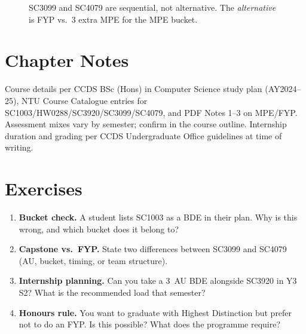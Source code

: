 \begin{figure}[h]
\centering
{}
\caption{SC3099 and SC4079 are sequential, not alternative. The \emph{alternative} is FYP vs.\ 3 extra MPE for the MPE bucket.}
\label{fig:capstone-fyp-flow}
\end{figure}

\section{Chapter Notes}
Course details per CCDS BSc (Hons) in Computer Science study plan (AY2024--25), NTU Course Catalogue entries for SC1003/HW0288/SC3920/SC3099/SC4079, and PDF Notes 1--3 on MPE/FYP. Assessment mixes vary by semester; confirm in the course outline. Internship duration and grading per CCDS Undergraduate Office guidelines at time of writing.

\section{Exercises}
\label{sec:ch04-exercises}
\begin{enumerate}[label=E4.\arabic*, leftmargin=*, itemsep=0.8em]
    \item \textbf{Bucket check.} A student lists SC1003 as a BDE in their plan. Why is this wrong, and which bucket does it belong to?
    \item \textbf{Capstone vs.\ FYP.} State two differences between SC3099 and SC4079 (AU, bucket, timing, or team structure).
    \item \textbf{Internship planning.} Can you take a 3~AU BDE alongside SC3920 in Y3 S2? What is the recommended load that semester?
    \item \textbf{Honours rule.} You want to graduate with Highest Distinction but prefer not to do an FYP. Is this possible? What does the programme require?
\end{enumerate}
